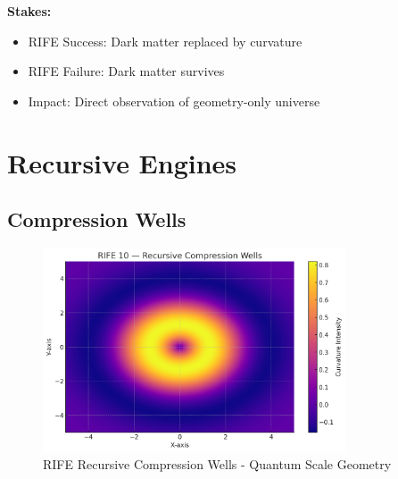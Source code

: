 \documentclass[11pt]{report}
\begin{document}
\textbf{Stakes:}
\begin{itemize}
\item RIFE Success: Dark matter replaced by curvature
\item RIFE Failure: Dark matter survives
\item Impact: Direct observation of geometry-only universe
\end{itemize}

\section{Recursive Engines}

\subsection{Compression Wells}
\begin{figure}[ht]
  \centering
  \includegraphics[width=0.8\textwidth]{recursive_engines/compression_wells.png}
  \caption{RIFE Recursive Compression Wells - Quantum Scale Geometry}
\end{figure}
\end{document}
